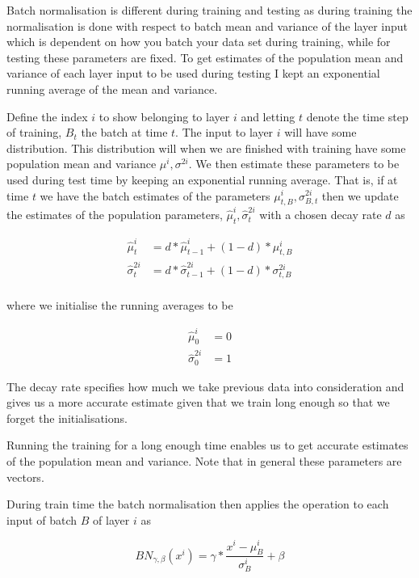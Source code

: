 \documentclass{article}
\begin{document}
Batch normalisation is different during training and testing as during
training the normalisation is done with respect to batch mean and variance of
the layer input which is dependent on how you batch your data set during
training, while for testing these parameters are fixed. To get estimates of the
population mean and variance of each layer input to be used during testing I
kept an exponential running average of the mean and variance.

Define the index $i$ to show belonging to layer $i$ and letting $t$ denote the
time step of training, $B_t$ the batch at time $t$. The input to layer $i$ will
have some distribution. This distribution will when we are finished with
training have some population mean and variance $\mu^i, \sigma^{2i}$. We then estimate
these parameters to be used during test time by keeping an exponential running
average. That is, if at time $t$ we have the batch estimates of the parameters
$\mu^i_{t, B}, \sigma^{2i}_{B, t}$ then we update the estimates of the population
parameters, $\hat{\mu}^i_t, \hat{\sigma}^{2i}_t$ with a chosen decay rate $d$ as 

\begin{align*}
  \hat{\mu}^i_t & = d * \hat{\mu}^i_{t-1} + (1 - d) * \mu^i_{t, B} \\
  \hat{\sigma}^{2i}_t & = d * \hat{\sigma}^{2i}_{t-1} + (1 - d) * \sigma^{2i}_{t, B} \\
\end{align*}

where we initialise the running averages to be

\begin{align*}
  \hat{\mu}^i_0 & = 0 \\
  \hat{\sigma}^{2i}_0 & = 1 
\end{align*}

The decay rate specifies how much we take previous data into consideration and
gives us a more accurate estimate given that we train long enough so that we
forget the initialisations.

Running the training for a long enough time enables us to get accurate estimates
of the population mean and variance. Note that in general these parameters are
vectors.

During train time the batch normalisation then applies the operation to each
input of batch $B$ of layer $i$ as

\begin{equation}
  BN_{\gamma, \beta}(x^i) = \gamma * \frac{x^i - \mu^i_B}{\sigma^i_B} + \beta
\end{equation}
\end{document}

